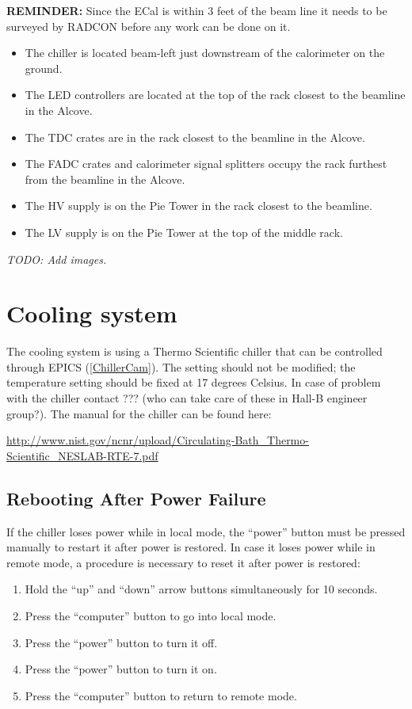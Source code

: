 \documentclass[12pt]{article}
\begin{document}
{\bf REMINDER:} Since the ECal is within 3 feet of the beam line it needs to be surveyed by RADCON before any work can be done on it.
   {\footnotesize
\begin{itemize}
\item
The chiller is located beam-left just downstream of the calorimeter on the ground.
\item
The LED controllers are located at the top of the rack closest to the beamline in the Alcove.
\item
The TDC crates are in the rack closest to the beamline in the Alcove.
\item
The FADC crates and calorimeter signal splitters occupy the rack furthest from the beamline in the Alcove.
\item
The HV supply is on the Pie Tower in the rack closest to the beamline.
\item
The LV supply is on the Pie Tower at the top of the middle rack. 
\end{itemize}
{\it TODO: Add images.}
}

   \section{Cooling system}

   The cooling system is using a Thermo Scientific chiller that can be controlled through EPICS (\ref{ChillerCam}). The setting should not be modified; the temperature setting should be fixed at 17 degrees Celsius. In case of problem with the chiller contact ??? (who can take care of these in Hall-B engineer group?).  The manual for the chiller can be found here:

   {\noindent\footnotesize\url{http://www.nist.gov/ncnr/upload/Circulating-Bath\_Thermo-Scientific\_NESLAB-RTE-7.pdf}}
     \subsection{Rebooting After Power Failure}
     If the chiller loses power while in local mode, the ``power'' button must be pressed manually to restart it after power is restored.  In case it loses power while in remote mode, a procedure is necessary to reset it after power is restored:
   {\footnotesize
     \begin{enumerate}
         \item Hold the ``up'' and ``down'' arrow buttons simultaneously for 10 seconds.
         \item Press the ``computer'' button to go into local mode.
         \item Press the ``power'' button to turn it off.
         \item Press the ``power'' button to turn it on.
         \item Press the ``computer'' button to return to remote mode.
    \end{enumerate}
    }
\end{document}
